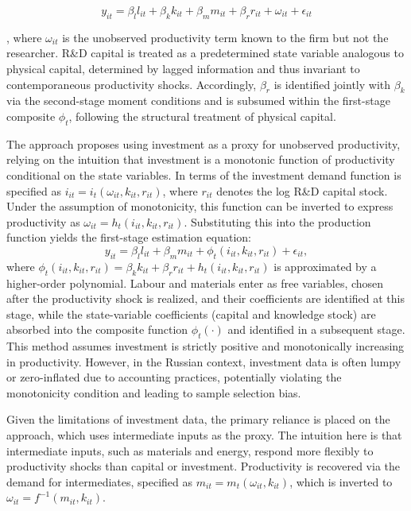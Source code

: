\documentclass[a4paper, 12pt]{article}
\begin{document}
\begin{equation}
y_{it} = \beta_l l_{it} + \beta_k k_{it} + \beta_m m_{it} + \beta_r r_{it} + \omega_{it} + \epsilon_{it}
\end{equation}

, where $\omega_{it}$ is the unobserved productivity term known to the firm but not the researcher. R\&D capital is treated as a predetermined state variable analogous to physical capital, determined by lagged information and thus invariant to contemporaneous productivity shocks. Accordingly, $\beta_r$ is identified jointly with $\beta_k$ via the second-stage moment conditions and is subsumed within the first-stage composite $\phi_t$, following the structural treatment of physical capital.

The \textcite{olley1992dynamics} approach proposes using investment as a proxy for unobserved productivity, relying on the intuition that investment is a monotonic function of productivity conditional on the state variables. In terms of the investment demand function is specified as $i_{it} = i_t(\omega_{it}, k_{it}, r_{it})$, where $r_{it}$ denotes the log R\&D capital stock. Under the assumption of monotonicity, this function can be inverted to express productivity as $\omega_{it} = h_t(i_{it}, k_{it}, r_{it})$. Substituting this into the production function yields the first-stage estimation equation:
\begin{equation}
y_{it} = \beta_l l_{it} + \beta_m m_{it} + \phi_t(i_{it}, k_{it}, r_{it}) + \epsilon_{it},
\end{equation}
\noindent where $\phi_t(i_{it}, k_{it}, r_{it}) = \beta_k k_{it} + \beta_r r_{it} + h_t(i_{it}, k_{it}, r_{it})$ is approximated by a higher-order polynomial. Labour and materials enter as free variables, chosen after the productivity shock is realized, and their coefficients are identified at this stage, while the state-variable coefficients (capital and knowledge stock) are absorbed into the composite function $\phi_t(\cdot)$ and identified in a subsequent stage. This method assumes investment is strictly positive and monotonically increasing in productivity. However, in the Russian context, investment data is often lumpy or zero-inflated due to accounting practices, potentially violating the monotonicity condition and leading to sample selection bias.

Given the limitations of investment data, the primary reliance is placed on the \textcite{levinsohn2003estimating} approach, which uses intermediate inputs as the proxy. The intuition here is that intermediate inputs, such as materials and energy, respond more flexibly to productivity shocks than capital or investment. Productivity is recovered via the demand for intermediates, specified as $m_{it} = m_t(\omega_{it}, k_{it})$, which is inverted to $\omega_{it} = f^{-1}(m_{it}, k_{it})$.
\end{document}
